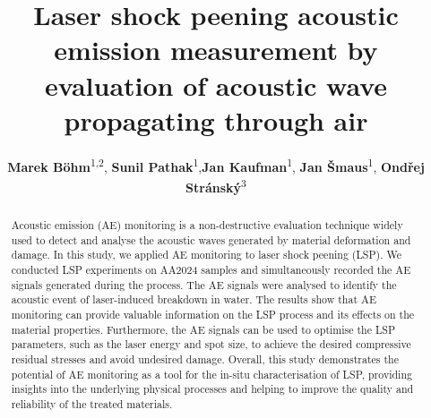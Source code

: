 \documentclass[a4paper, amsfonts, amssymb, amsmath, reprint, showkeys, nofootinbib, twoside]{revtex4-1}
\begin{document}
\title{Laser shock peening acoustic emission measurement by evaluation of acoustic wave propagating through air}
\author{\textbf{Marek Böhm}\textsuperscript{1,2}, \textbf{Sunil Pathak}\textsuperscript{1},\textbf{Jan Kaufman}\textsuperscript{1}, \textbf{Jan Šmaus}\textsuperscript{1}, \textbf{Ondřej Stránský}\textsuperscript{3}}




\begin{abstract}
Acoustic emission (AE) monitoring is a non-destructive evaluation technique widely used to detect and analyse the acoustic waves generated by material deformation and damage. In this study, we applied AE monitoring to laser shock peening (LSP). We conducted LSP experiments on AA2024 samples and simultaneously recorded the AE signals generated during the process. The AE signals were analysed to identify the acoustic event of laser-induced breakdown in water. The results show that AE monitoring can provide valuable information on the LSP process and its effects on the material properties. Furthermore, the AE signals can be used to optimise the LSP parameters, such as the laser energy and spot size, to achieve the desired compressive residual stresses and avoid undesired damage. Overall, this study demonstrates the potential of AE monitoring as a tool for the in-situ characterisation of LSP, providing insights into the underlying physical processes and helping to improve the quality and reliability of the treated materials.
\end{abstract}



\maketitle






% 
\printbibliography

\appendix*

\end{document}
